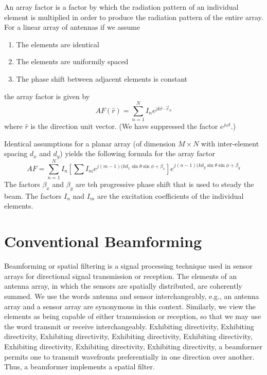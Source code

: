 \documentclass[11pt]{report}
\theoremstyle{example}
\begin{document}
An array factor is a factor by which the radiation pattern of an individual element is multiplied in order to produce the radiation pattern of the entire array. For a linear array of antennas if we assume
\begin{enumerate}
	\item The elements are identical
	\item The elements are uniformily spaced
	\item The phase shift between adjacent elements is constant
\end{enumerate}
the array factor is given by
\begin{equation}
	AF(\hat{r})=\sum_{n=1}^N{I_ne^{jk\hat{r}\cdot\overrightarrow{r}_n}}
\end{equation}
where $\hat{r}$ is the direction unit vector. (We have suppressed the factor $e^{j\omega t}$.)

Identical assumptions for a planar array (of dimension $M\times N$ with inter-element spacing $d_x$ and $d_y$) yields the following formula for the array factor
\begin{equation}
	AF=\sum_{n=1}^N{I_n\left[\sum{I_me^{j(m-1)(kd_x\sin{\theta}\sin{\phi}+\beta_x}}\right]e^{j(n-1)(kd_y\sin{\theta}\sin{\phi}+\beta_y}}
\end{equation}
The factors $\beta_x$ and $\beta_y$ are teh progressive phase shift that is used to steady the beam. The factors $I_n$ nad $I_m$ are the excitation coefficients of the individual elements.

\section{Conventional Beamforming}
Beamforming or spatial filtering is a signal processing technique used in sensor arrays for directional signal transmission or reception. The elements of an antenna array, in which the sensors are spatially distributed, are coherently summed. We use the words antenna and sensor interchangeably, e.g., an antenna array and a sensor array are synonymous in this context. Similarly, we view the elements as being capable of either transmission or reception, so that we may use the word transmit or receive interchangeably. Exhibiting directivity, Exhibiting directivity, Exhibiting directivity, Exhibiting directivity, Exhibiting directivity, Exhibiting directivity, Exhibiting directivity, Exhibiting directivity, a beamformer permits one to transmit wavefronts preferentially in one direction over another. Thus, a beamformer implements a spatial filter.
\end{document}
